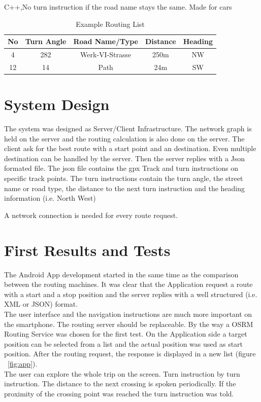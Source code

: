\documentclass{sig-alternate}
\begin{document}
C++,No turn instruction if the road name stays the same. Made for cars


\begin{table}
\centering
\caption{Example Routing List}
\begin{tabular}{|c|c|c|c|c|} \hline
No&Turn Angle&Road Name/Type&Distance&Heading\\ \hline
4&282&Werk-VI-Strasse&250m&NW\\ \hline
12&14&Path&24m&SW\\ \hline
\end{tabular}
\end{table}



\section{System Design}
The system was designed as Server/Client Infrastructure. The network graph is held on the server and the routing calculation is also done on the server.  The client ask for the best route with a start point and an destination. Even multiple destination can be handled by the server. Then the server replies with a Json formated file. The json file contains the gpx Track and turn instructions on specific track points. The turn instructions contain the turn angle, the street name or road type, the distance to the next turn instruction and the heading information (i.e. North West) 

A network connection is needed for every route request. 

\section{First Results and Tests}
The Android App development started in the same time as the comparison between the routing machines. It was clear that the Application request a route with a start and a stop position and the server replies with a well structured (i.e. XML or JSON) format. \\
The user interface and the navigation instructions are much more important on the smartphone. The routing server should be replaceable. 
By the way a OSRM Routing Service was chosen for the first test. On the Application side a target position can be selected from a list and the actual position was used as start position. After the routing request, the response is displayed in a new list (figure ~\ref{fig:app}). \\
The user can explore the whole trip on the screen. Turn instruction by turn instruction. The distance to the next crossing is spoken periodically. If the proximity of the crossing point was reached the turn instruction was told. \\
\end{document}
